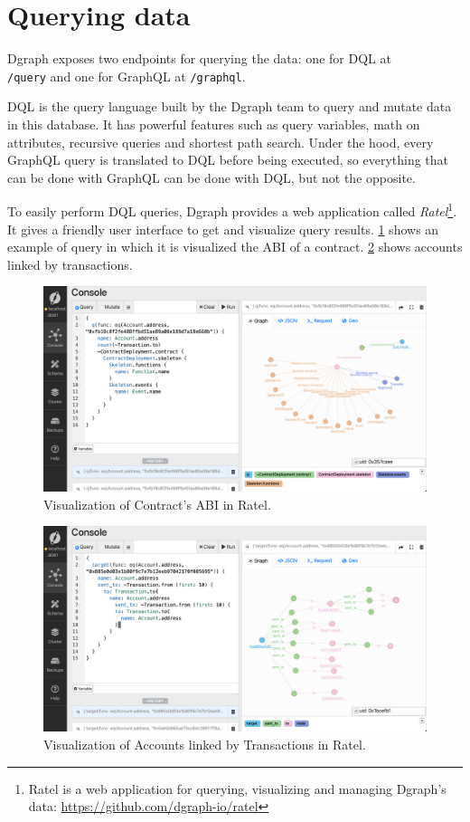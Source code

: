  \section{Querying data}

Dgraph exposes two endpoints for querying the data: one for DQL at \\{\tt /query} and one for GraphQL at {\tt /graphql}.

DQL is the query language built by the Dgraph team to query and mutate data in this database. It has powerful features such as query variables, math on attributes, recursive queries and shortest path search. Under the hood, every GraphQL query is translated to DQL before being executed, so everything that can be done with GraphQL can be done with DQL, but not the opposite.

To easily perform DQL queries, Dgraph provides a web application called \textit{Ratel}\footnote{Ratel is a web application for querying, visualizing and managing Dgraph's data: \url{https://github.com/dgraph-io/ratel}}. It gives a friendly user interface to get and visualize query results. \cref{fig:ratel-1} shows an example of query in which it is visualized the ABI of a contract. \cref{fig:ratel-2} shows accounts linked by transactions.

\begin{figure}[H]
    \centering
    \includegraphics[width=1\textwidth]{Figures/results/ratel-1.png}
    \caption{Visualization of Contract's ABI in Ratel.}
    \label{fig:ratel-1}
\end{figure}

\begin{figure}[H]
    \centering
    \includegraphics[width=1\textwidth]{Figures/results/ratel-2.png}
    \caption{Visualization of Accounts linked by Transactions in Ratel.}
    \label{fig:ratel-2}
\end{figure}

